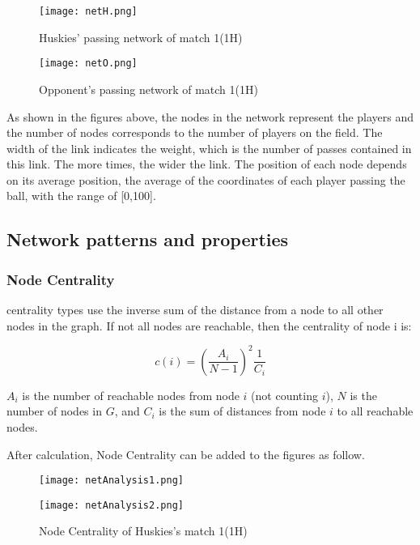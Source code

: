 \documentclass{mcmthesis}
\begin{document}
\begin{figure}
        \centering
        \texttt{[image: netH.png]}
        \caption{Huskies' passing network of match 1(1H)}
\end{figure}

\begin{figure}
        \centering
        \texttt{[image: netO.png]}
        \caption{Opponent's passing network of match 1(1H)}
\end{figure}

As shown in the figures above, the nodes in the network represent the players and the number of
nodes corresponds to the number of players on the field. The width of the
link indicates the weight, which is the number of passes contained in this link. The more times,
the wider the link. The position of each node depends on its average position, the average of
the coordinates of each player passing the ball, with the range of [0,100].

\subsection{Network patterns and properties}
\subsubsection{Node Centrality}
centrality types use the inverse sum of the distance from a node to all other nodes in the graph.
If not all nodes are reachable, then the centrality of node i is:

\begin{equation}
        c(i)=\left(\frac{A_{i}}{N-1}\right)^{2} \frac{1}{C_{i}}
\end{equation}

$A_i$ is the number of reachable nodes from node $i$ (not counting $i$), $N$ is the number of nodes in $G$, and $C_i$ is the sum of distances from node $i$ to all reachable nodes.

After calculation, Node Centrality can be added to the figures as follow.

\begin{figure}
        \centering
        \begin{minipage}[c]{0.45\textwidth}
                \centering
                \texttt{[image: netAnalysis1.png]}
        \end{minipage}
        \begin{minipage}[c]{0.45\textwidth}
                \centering
                \texttt{[image: netAnalysis2.png]}
        \end{minipage}
        \caption{Node Centrality of Huskies's match 1(1H)}
\end{figure}
\end{document}
